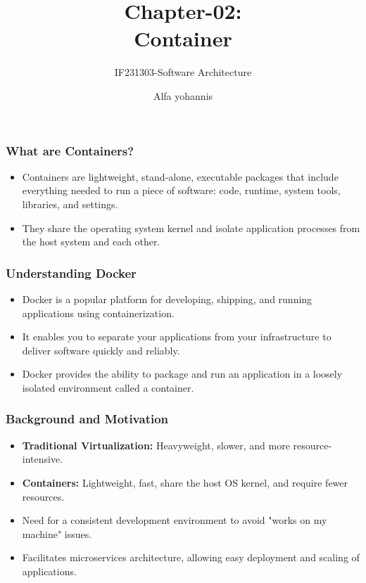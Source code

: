 \documentclass[aspectratio=169, table]{beamer}
\title{\LARGE{Chapter-02:}\\ \Huge{Container} \vspace{20pt}}
\subtitle{IF231303-Software Architecture}
\author{Alfa yohannis}
\begin{document}
    \begin{frame}[plain]
        \maketitle
    \end{frame}

    \begin{frame}
        \frametitle{What are Containers?}
        \begin{itemize}
            \item Containers are lightweight, stand-alone, executable packages that include everything needed to run a piece of software: code, runtime, system tools, libraries, and settings.
            \item They share the operating system kernel and isolate application processes from the host system and each other.
        \end{itemize}
    \end{frame}

    \begin{frame}
        \frametitle{Understanding Docker}
        \begin{itemize}
            \item Docker is a popular platform for developing, shipping, and running applications using containerization.
            \item It enables you to separate your applications from your infrastructure to deliver software quickly and reliably.
            \item Docker provides the ability to package and run an application in a loosely isolated environment called a container.
        \end{itemize}
    \end{frame}


    \begin{frame}
        \frametitle{Background and Motivation}
        \begin{itemize}
            \item \textbf{Traditional Virtualization:} Heavyweight, slower, and more resource-intensive.
            \item \textbf{Containers:} Lightweight, fast, share the host OS kernel, and require fewer resources.
            \item Need for a consistent development environment to avoid "works on my machine" issues.
            \item Facilitates microservices architecture, allowing easy deployment and scaling of applications.
        \end{itemize}
    \end{frame}
\end{document}

